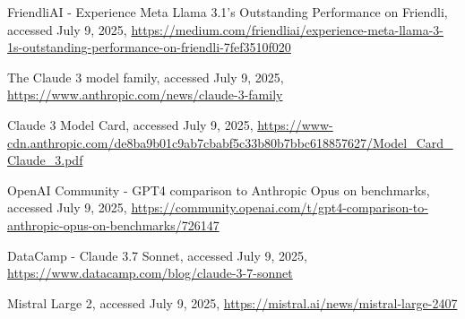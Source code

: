 \documentclass[12pt, a4paper]{article}
\begin{document}
\begin{enumerate}[label={[\arabic*]}]
    \item FriendliAI - Experience Meta Llama 3.1's Outstanding Performance on Friendli, accessed July 9, 2025, \url{https://medium.com/friendliai/experience-meta-llama-3-1s-outstanding-performance-on-friendli-7fef3510f020}
    \item The Claude 3 model family, accessed July 9, 2025, \url{https://www.anthropic.com/news/claude-3-family}
    \item Claude 3 Model Card, accessed July 9, 2025, \url{https://www-cdn.anthropic.com/de8ba9b01c9ab7cbabf5c33b80b7bbc618857627/Model_Card_Claude_3.pdf}
    \item OpenAI Community - GPT4 comparison to Anthropic Opus on benchmarks, accessed July 9, 2025, \url{https://community.openai.com/t/gpt4-comparison-to-anthropic-opus-on-benchmarks/726147}
    \item DataCamp - Claude 3.7 Sonnet, accessed July 9, 2025, \url{https://www.datacamp.com/blog/claude-3-7-sonnet}
    \item Mistral Large 2, accessed July 9, 2025, \url{https://mistral.ai/news/mistral-large-2407}
\end{enumerate}
\end{document}
